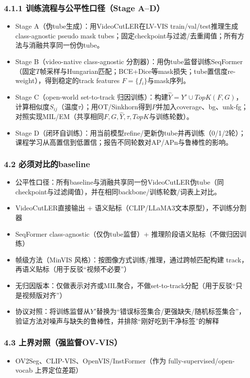 \documentclass[UTF8]{ctexart}
\begin{document}
\subsubsection*{4.1.1 训练流程与公平性口径（Stage A--D）}
\begin{itemize}
\item Stage A（伪tube生成）：用VideoCutLER在LV-VIS train/val/test推理生成class-agnostic pseudo mask tubes；固定checkpoint与过滤/去重阈值；所有方法与消融共享同一份伪tube。
\item Stage B（video-native class-agnostic 分割器）：用伪tube监督训练SeqFormer（固定$T$帧采样与Hungarian匹配；BCE+Dice等mask损失；tube置信度re-weight），得到稳定的track features $F=\{f_i\}$与mask序列。
\item Stage C（open-world set-to-track 归因训练）：构建$\hat{Y}=Y'\cup TopK(F,G)$，计算相似度$S_{ij}$（温度$\tau$）；用OT/Sinkhorn得到$P$并加入coverage、bg、unk-fg；对照实现MIL/EM（共享相同$F,G,\hat{Y},\tau,TopK$与训练轮数）。
\item Stage D（闭环自训练）：用当前模型refine/更新伪tube并再训练（0/1/2轮）；课程学习从高置信到低置信；报告不同轮数对AP/APn与鲁棒性的影响。
\end{itemize}

\subsubsection*{4.2 必须对比的baseline}
\begin{itemize}
\item 公平性口径：所有baseline与消融共享同一份VideoCutLER伪tube（同checkpoint与过滤阈值），并在相同backbone/训练轮数/词表上对比。
\item VideoCutLER直接输出 + 语义贴标（CLIP/LLaMA3文本原型），不训练分割器
\item SeqFormer class-agnostic（仅伪tube监督）+ 推理阶段语义贴标（不做归因训练）
\item 帧级方法（MinVIS 风格）：按图像方式训练/推理，通过跨帧匹配构建 track，再语义贴标（用于反驳“视频不必要”）
\item 无归因版本：仅做表示对齐或MIL聚合，不做set-to-track分配（用于反驳“只是视频版对齐”）
\item 协议对照：将训练监督从$Y'$替换为“错误标签集合/更强缺失/随机标签集合”，验证方法对噪声与缺失的鲁棒性，并排除“刚好吃到干净标签”的解释
\end{itemize}

\subsubsection*{4.3 上界对照（强监督OV-VIS）}
\begin{itemize}
\item OV2Seg、CLIP-VIS、OpenVIS/InstFormer（作为 fully-supervised/open-vocab 上界定位差距）
\end{itemize}
\end{document}
